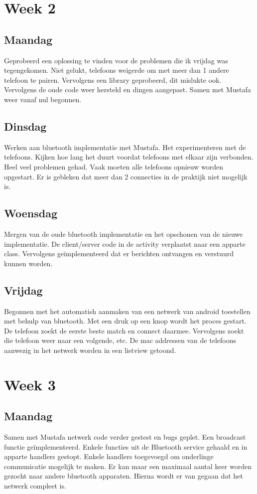\documentclass[12pt]{article}
\begin{document}
\section*{Week 2}
\subsection*{Maandag}
Geprobeerd een oplossing te vinden voor de problemen die ik vrijdag was tegengekomen. Niet gelukt, telefoons weigerde om met meer dan 1 andere telefoon te pairen. Vervolgens een library geprobeerd, dit mislukte ook. Vervolgens de oude code weer hersteld en dingen aangepast. Samen met Mustafa weer vanaf nul begonnen.

\subsection*{Dinsdag}
Werken aan bluetooth implementatie met Mustafa. Het experimenteren met de telefoons. Kijken hoe lang het duurt voordat telefoons met elkaar zijn verbonden. Heel veel problemen gehad. Vaak moeten alle telefoons opnieuw worden opgestart. Er is gebleken dat meer dan 2 connecties in de praktijk niet mogelijk is.

\subsection*{Woensdag}
Mergen van de oude bluetooth implementatie en het opschonen van de nieuwe implementatie. De client/server code in de activity verplaatst naar een apparte class. Vervolgens ge\"implementeerd dat er berichten ontvangen en verstuurd kunnen worden.

\subsection*{Vrijdag}
Begonnen met het automatish aanmaken van een netwerk van android toestellen met behulp van bluetooth. Met een druk op een knop wordt het proces gestart. De telefoon zoekt de eerste beste match en connect daarmee. Vervolgens zoekt die telefoon weer naar een volgende, etc. De mac addressen van de telefoons aanwezig in het netwerk worden in een listview getoond.

\section*{Week 3}
\subsection*{Maandag}
Samen met Mustafa netwerk code verder gestest en bugs geplet. Een broadcast functie ge\"implementeerd. Enkele functies uit de Bluetooth service gehaald en in apparte handlers gestopt. Enkele handlers toegevoegd om onderlinge communicatie mogelijk te maken. Er kan maar een maximaal aantal keer worden gezocht naar andere bluetooth apparaten. Hierna wordt er van gegaan dat het netwerk compleet is. 
\end{document}

